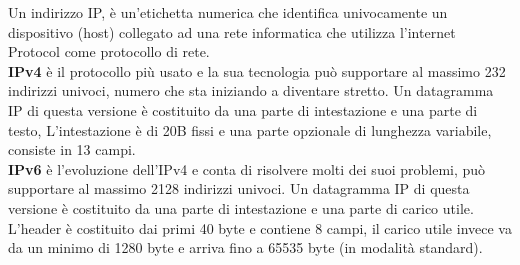 Un indirizzo IP, è un’etichetta numerica che identifica univocamente un dispositivo (host) collegato ad una rete informatica che utilizza l’internet Protocol come protocollo di rete.\\
\textbf{IPv4} è il protocollo più usato e la sua tecnologia può supportare al massimo 232 indirizzi univoci, numero che sta iniziando a diventare stretto.
Un datagramma IP di questa versione è costituito da una parte di intestazione e una parte di testo, L’intestazione è di 20B fissi e una parte opzionale di lunghezza variabile, consiste in 13 campi.\\
\textbf{IPv6} è l’evoluzione dell’IPv4 e conta di risolvere molti dei suoi problemi, può supportare al massimo 2128 indirizzi univoci.
Un datagramma IP di questa versione è costituito da una parte di intestazione e una parte di carico utile. L’header è costituito dai primi 40 byte e contiene 8 campi, il carico utile invece va da un minimo di 1280 byte e arriva fino a 65535 byte (in modalità standard).
 
